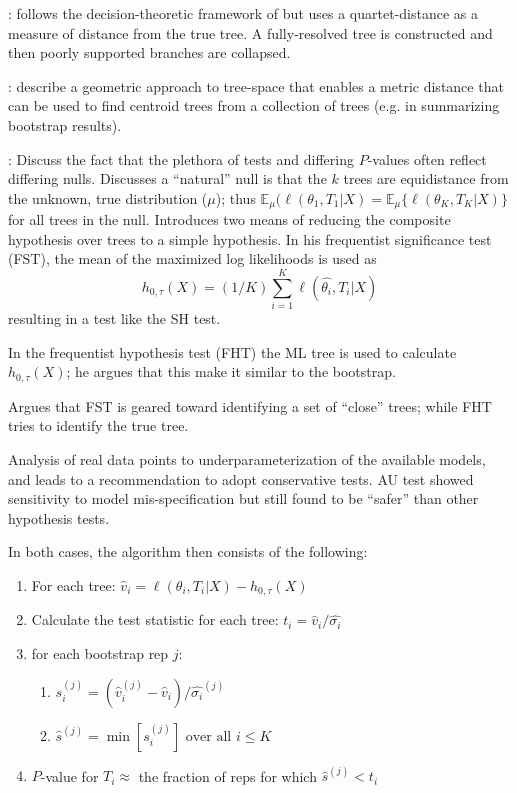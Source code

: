 \documentclass[11pt]{article}
\newcommand{\sdLL}[1]{\hat{\sigma_{#1}}}
\newcommand{\sdLLBoot}[2]{\hat{\sigma_{#1}}^{(#2)}}
\newcommand{\like}{\ell}
\newcommand{\expectation}{{\mathbb{E}}}
\newcommand{\pvalue}{$P$-value\xspace}
\newcommand{\pvalues}{$P$-values\xspace}
\begin{document}
\citet{BerryGC2000}: follows the decision-theoretic framework of \citet{BerryG1996} but uses a quartet-distance as a measure of distance from the true tree. A fully-resolved tree is constructed and then poorly supported branches are collapsed.

\citet{BilleraHV2001}: describe a geometric approach to tree-space that enables a metric distance that can be used to find centroid trees from a collection of trees (e.g. in summarizing bootstrap results).

\citet{ArisBrosou2003}: Discuss the fact that the plethora of tests and differing \pvalues often reflect differing nulls.  Discusses a ``natural'' null is that the $k$ trees are equidistance from the unknown, true distribution ($\mu$); thus $\expectation_{\mu}(\like(\theta_1,T_1|X) = \expectation_{\mu}\{\like(\theta_K,T_K|X)\}$ for all trees in the null.  Introduces two means of reducing the composite hypothesis over trees to a simple hypothesis.
In his frequentist significance test (FST), the mean of the maximized log likelihoods is used as $$h_{0,\tau}(X) = (1/K)\sum_{i=1}^K \like(\hat{\theta_i},T_i|X)$$
resulting in a test like the SH test.

In the frequentist hypothesis test (FHT) the ML tree is used to calculate $h_{0,\tau}(X)$; he argues that this make it similar to the bootstrap.

Argues that FST is geared toward identifying a set of ``close'' trees; while FHT tries to identify the true tree.

Analysis of real data points to underparameterization of the available models, and leads to a recommendation to adopt conservative tests.
AU test showed sensitivity to model mis-specification but still found to be ``safer'' than other hypothesis tests.

In both cases, the algorithm then consists of the following:
\begin{enumerate}
	\item For each tree: $\hat{v}_i = \like(\theta_i,T_i|X) - h_{0,\tau}(X)$
	\item Calculate the test statistic for each tree: $t_i = \hat{v}_i/\sdLL{i}$
	\item for each bootstrap rep $j$:
	\begin{enumerate}
		\item $s_i^{(j)} = \left(\hat{v}_i^{(j)} - \hat{v}_i \right)/\sdLLBoot{i}{j}$
		\item $\hat{s}^{(j)} = \min\left[{s_i^{(j)}}\right] \mbox{ over all } i\leq K$
	\end{enumerate}
	\item \pvalue for $T_i\approx$ the fraction of reps for which $\hat{s}^{(j)} < t_i$
\end{enumerate}
\end{document}
